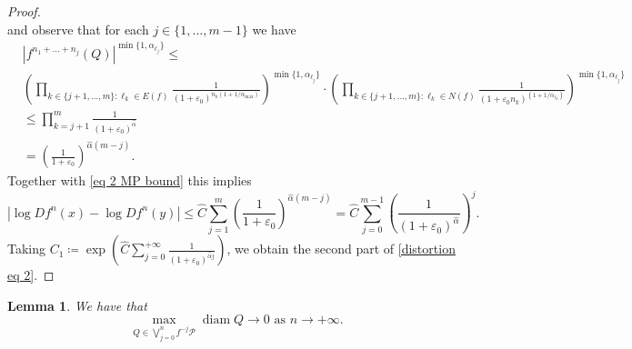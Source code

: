 \documentclass[12pt]{amsart}
\numberwithin{equation}{section} %
\numberwithin{figure}{section} %
\theoremstyle{plain}
\newtheorem{lemm}[prop]{Lemma}
\theoremstyle{definition}
\theoremstyle{remark}
\theoremstyle{citing}
\renewcommand{\=}{\coloneqq}
\DeclareMathOperator{\diam}{diam}
\begin{document}
\begin{proof}
\begin{equation*}
    \end{equation*}
    and observe that for each $j\in\{1,\ldots,m-1\}$ we have
    \begin{equation*}
    \begin{split}
        &|f^{n_1+\ldots+n_j}(Q)|^{\min\{1,\alpha_{\ell_j}\}} \leq\\
        &\left(\prod_{k\in\{j+1,\ldots,m\}:\ell_k\in E(f)} \frac{1}{(1+\varepsilon_0)^{n_k(1+1/\alpha_{\max})}}\right)^{\min\{1,\alpha_{\ell_j}\}}\cdot\left(\prod_{k\in\{j+1,\ldots,m\}: \ell_k\in N(f)} \frac{1}{(1+\varepsilon_0 n_k)^{(1+1/\alpha_{\ell_k})}}\right)^{\min\{1,\alpha_{\ell_j}\}}\\
        &\leq  \prod_{k=j+1}^{m} \frac{1}{(1+\varepsilon_0)^{\widehat{\alpha}}}\\
       & = \left(\frac{1}{1+\varepsilon_0}\right)^{\widehat{\alpha}(m-j)}.
        \end{split}
    \end{equation*}
    Together with \eqref{eq 2 MP bound} this implies
    \begin{equation}
        |\log Df^n(x) - \log Df^n(y)| \leq \widehat{C}\sum_{j=1}^{m} \left(\frac{1}{1+\varepsilon_0}\right)^{\widehat{\alpha}(m-j)} = \widehat{C}\sum_{j=0}^{m-1} \left(\frac{1}{(1+\varepsilon_0)^{\widehat{\alpha}}}\right)^{j}. 
    \end{equation}
    Taking $C_1\= \exp(\widehat{C}\sum_{j=0}^{+\infty} \frac{1}{(1+\varepsilon_0)^{\widehat{\alpha}j}})$, we obtain the second part of \eqref{distortion eq 2}.
\end{proof}
\begin{lemm}\label{diam to 0}
    We have that
    \begin{equation}\label{diam to 0 eq0}
        \max_{Q\in\bigvee_{j=0}^{n}f^{-j}\mathcal{P}} \diam Q \to 0 \text{ as } n \to +\infty.
    \end{equation}
\end{lemm}
\end{document}

